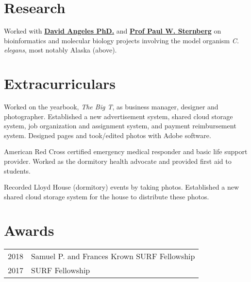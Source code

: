 \documentclass[]{resume}
\begin{document}
\begin{minipage}[t]{0.66\textwidth}

\section{Research}
Worked with \textbf{\href{https://dangeles.github.io/}{David Angeles PhD.}} and \textbf{\href{http://wormlab.caltech.edu/LabMembers/Paul}{Prof Paul W. Sternberg}} on bioinformatics and molecular biology projects involving the model organism \textit{C. elegans}, most notably Alaska (above).
\sectionsep


\section{Extracurriculars}
Worked on the yearbook, \textit{The Big T}, as business manager, designer and photographer. Established a new advertisement system, shared cloud storage system, job organization and assignment system, and payment reimbursement system. Designed pages and took/edited photos with Adobe software.
\sectionsep

American Red Cross certified emergency medical responder and basic life support provider. Worked as the dormitory health advocate and provided first aid to students.
\sectionsep

\vspace{-1em}
Recorded Lloyd House (dormitory) events by taking photos. Established a new shared cloud storage system for the house to distribute these photos.
\sectionsep


\section{Awards}
\begin{tabular}{rl}
2018     & Samuel P. and Frances Krown SURF Fellowship  \\
2017     & SURF Fellowship \\
\end{tabular}
\sectionsep


\end{minipage}
\end{document}
